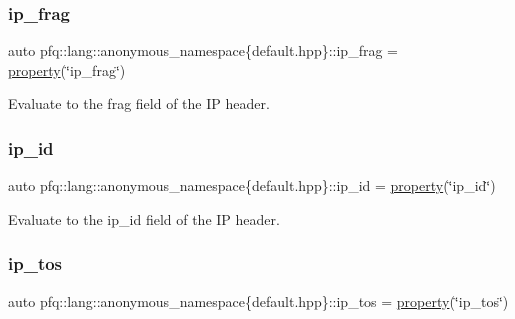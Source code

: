 \subsubsection{\texorpdfstring{ip\+\_\+frag}{ip\_frag}}
{\footnotesize\ttfamily auto pfq\+::lang\+::anonymous\+\_\+namespace\{default.\+hpp\}\+::ip\+\_\+frag = \hyperlink{namespacepfq_1_1lang_a1249450e72229273b0db707a286aea91}{property}(\char`\"{}ip\+\_\+frag\char`\"{})}



Evaluate to the {\ttfamily frag} field of the IP header. 

\mbox{\label{namespacepfq_1_1lang_1_1anonymous__namespace_02default_8hpp_03_a87620275a9e9760978d5660be0582852}} 
\subsubsection{\texorpdfstring{ip\+\_\+id}{ip\_id}}
{\footnotesize\ttfamily auto pfq\+::lang\+::anonymous\+\_\+namespace\{default.\+hpp\}\+::ip\+\_\+id = \hyperlink{namespacepfq_1_1lang_a1249450e72229273b0db707a286aea91}{property}(\char`\"{}ip\+\_\+id\char`\"{})}



Evaluate to the {\ttfamily ip\+\_\+id} field of the IP header. 

\mbox{\label{namespacepfq_1_1lang_1_1anonymous__namespace_02default_8hpp_03_acc5d2b786c39d4177ab37ee16ee2295d}} 
\subsubsection{\texorpdfstring{ip\+\_\+tos}{ip\_tos}}
{\footnotesize\ttfamily auto pfq\+::lang\+::anonymous\+\_\+namespace\{default.\+hpp\}\+::ip\+\_\+tos = \hyperlink{namespacepfq_1_1lang_a1249450e72229273b0db707a286aea91}{property}(\char`\"{}ip\+\_\+tos\char`\"{})}



